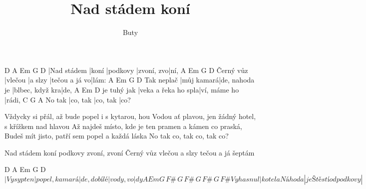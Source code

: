 \documentclass[columns]{song}
\title{Nad stádem koní}
\author{Buty}
\begin{document}
\strophe
D           A     Em       G          D
|Nad stádem |koní |podkovy |zvoní, zvo|ní,
          A       Em      G             D
Černý vůz |vlečou |a slzy |tečou a já vo|lám:
           A          Em             G               D
Tak neplač |můj kamará|de, nahoda je |blbec, když kra|de,
            A                   Em           D
je tuhý jak |veka a řeka ho spla|ví, máme ho |rádi,
       C        G        A
No tak |co, tak |co, tak |co?
\endstrophe

\strophe*
Vždycky si přál, až bude popel i s kytarou, hou
Vodou ať plavou, jen žádný hotel, s křížkem nad hlavou
Až najdeš místo, kde je ten pramen a kámen co praská,
Budeš mít jisto, patří sem popel a každá láska
No tak co, tak co, tak co?
\endstrophe

\strophe*
Nad stádem koní podkovy zvoní, zvoní
Černý vůz vlečou a slzy tečou a já šeptám
\endstrophe

\strophe
   D          A             Em           G        D
\[ |Vysyp ten |popel, kamará|de, do bílé |vody, vo|dy
         A               Em                   G\,F\#\,G\,F\#\,G\,F\#\,G\,F\#
Vyhasnul |kotel a Náhoda |je Štěstí od podkovy| \]
\endstrophe
\end{document}
